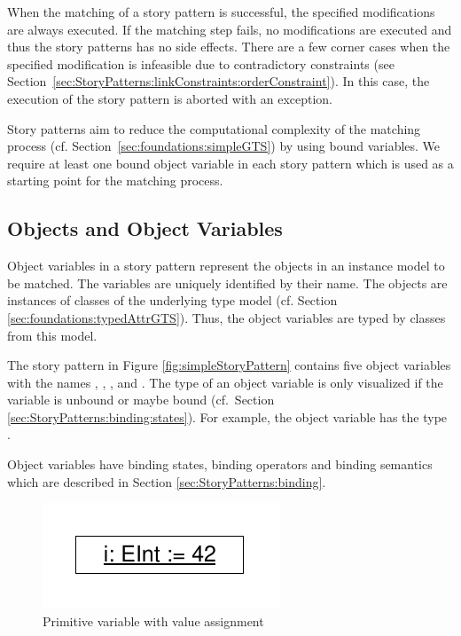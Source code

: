 When the matching of a story pattern is successful, the specified modifications are always executed. If the matching step fails, no modifications are executed and thus the story patterns has no side effects.
There are a few corner cases when the specified modification is infeasible due to contradictory constraints (see Section~\ref{sec:StoryPatterns:linkConstraints:orderConstraint}). In this case, the execution of the story pattern is aborted with an exception.

Story patterns aim to reduce the computational complexity of the matching process (cf. Section~\ref{sec:foundations:simpleGTS}) by using bound variables.
We require at least one bound object variable in each story pattern which is used as a starting point for the matching process.


\subsection{Objects and Object Variables}
\label{sec:StoryPatterns:objects}

Object variables in a story pattern represent the objects in an instance model to be matched.
The variables are uniquely identified by their name.
The objects are instances of classes of the underlying type model (cf.
Section \ref{sec:foundations:typedAttrGTS}). Thus, the object variables are typed by classes from this model.

The story pattern in Figure \ref{fig:simpleStoryPattern} contains five
object variables with the names , , ,  and
. 
The type of an object variable is only visualized if the
variable is unbound or maybe bound (cf.\ Section
\ref{sec:StoryPatterns:binding:states}). For example, the object variable  has the type .

Object variables have binding states, binding operators and binding semantics which are described in Section  \ref{sec:StoryPatterns:binding}.


\ext %
{

\begin{figure}[htb]
  \centering
  \includegraphics[scale=0.6]{figures/PrimitiveVariable}
  \caption{Primitive variable with value assignment}
  \label{fig:primitiveVariable}
\end{figure}

}%



